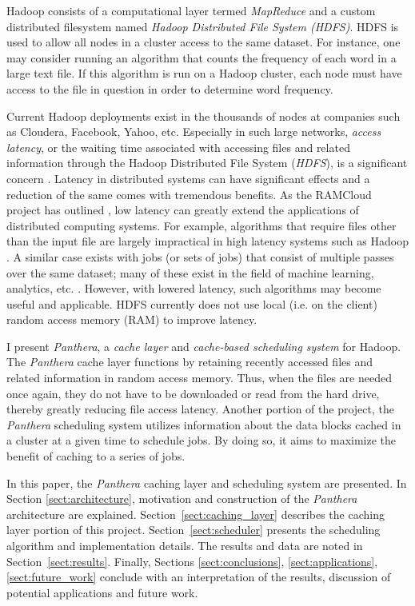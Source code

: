 \documentclass[12pt]{article}
\begin{document}
Hadoop consists of a computational layer termed \textit{MapReduce} and a custom distributed filesystem named \textit{Hadoop Distributed File System (HDFS)}. HDFS is used to allow all nodes in a cluster access to the same dataset. For instance, one may consider running an algorithm that counts the frequency of each word in a large text file. If this algorithm is run on a Hadoop cluster, each node must have access to the file in question in order to determine word frequency.

Current Hadoop deployments exist in the thousands of nodes at companies such as Cloudera, Facebook, Yahoo, etc. Especially in such large networks, \textit{access latency}, or the waiting time associated with accessing files and related information through the Hadoop Distributed File System (\textit{HDFS}), is a significant concern \cite{hdfs}. Latency in distributed systems can have significant effects and a reduction of the same comes with tremendous benefits. As the RAMCloud project has outlined \cite{ramcloud}, low latency can greatly extend the applications of distributed computing systems. For example, algorithms that require files other than the input file are largely impractical in high latency systems such as Hadoop \cite{ramcloud, spark}. A similar case exists with jobs (or sets of jobs) that consist of multiple passes over the same dataset; many of these exist in the field of machine learning, analytics, etc. \cite{spark}. However, with lowered latency, such algorithms may become useful and applicable. HDFS currently does not use local (i.e. on the client) random access memory (RAM) to improve latency.

I present \textit{Panthera}, a \textit{cache layer} and \textit{cache-based scheduling system} for Hadoop. The \textit{Panthera} cache layer functions by retaining recently accessed files and related information in random access memory. Thus, when the files are needed once again, they do not have to be downloaded or read from the hard drive, thereby greatly reducing file access latency. Another portion of the project, the \textit{Panthera} scheduling system utilizes information about the data blocks cached in a cluster at a given time to schedule jobs. By doing so, it aims to maximize the benefit of caching to a series of jobs.

In this paper, the \textit{Panthera} caching layer and scheduling system are presented. In Section \ref{sect:architecture}, motivation and construction of the \textit{Panthera} architecture are explained. Section~\ref{sect:caching_layer} describes the caching layer portion of this project. Section~\ref{sect:scheduler} presents the scheduling algorithm and implementation details. The results and data are noted in Section~\ref{sect:results}. Finally, Sections \ref{sect:conclusions}, \ref{sect:applications}, \ref{sect:future_work} conclude with an interpretation of the results, discussion of potential applications and future work.
\end{document}
